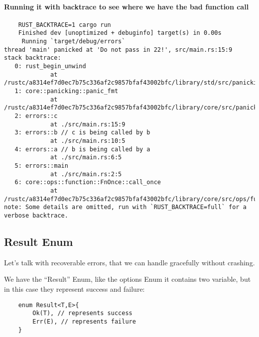 \paragraph*{Running it with backtrace to see where we have the bad function call}
\begin{lstlisting}
    RUST_BACKTRACE=1 cargo run
    Finished dev [unoptimized + debuginfo] target(s) in 0.00s
     Running `target/debug/errors`
thread 'main' panicked at 'Do not pass in 22!', src/main.rs:15:9
stack backtrace:
   0: rust_begin_unwind
             at /rustc/a8314ef7d0ec7b75c336af2c9857bfaf43002bfc/library/std/src/panicking.rs:584:5
   1: core::panicking::panic_fmt
             at /rustc/a8314ef7d0ec7b75c336af2c9857bfaf43002bfc/library/core/src/panicking.rs:142:14
   2: errors::c
             at ./src/main.rs:15:9
   3: errors::b // c is being called by b
             at ./src/main.rs:10:5
   4: errors::a // b is being called by a 
             at ./src/main.rs:6:5
   5: errors::main
             at ./src/main.rs:2:5
   6: core::ops::function::FnOnce::call_once
             at /rustc/a8314ef7d0ec7b75c336af2c9857bfaf43002bfc/library/core/src/ops/function.rs:248:5
note: Some details are omitted, run with `RUST_BACKTRACE=full` for a verbose backtrace.
\end{lstlisting}

\subsection{Result Enum}
Let's talk with recoverable errors, that we can handle gracefully without crashing. 

We have the ``Result'' Enum, like the options Enum it contains two variable, but in this case they represent success and failure:\begin{lstlisting}
    enum Result<T,E>{
        Ok(T), // represents success
        Err(E), // represents failure
    }
\end{lstlisting}
\newpage
